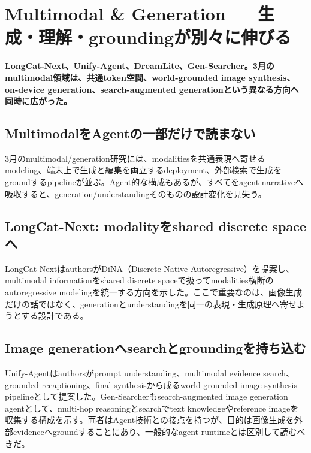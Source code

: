 \section{Multimodal \& Generation — 生成・理解・groundingが別々に伸びる}
\label{pkg:multimodal-generation-march}
\noindent\textbf{LongCat-Next、Unify-Agent、DreamLite、Gen-Searcher。3月のmultimodal領域は、共通token空間、world-grounded image synthesis、on-device generation、search-augmented generationという異なる方向へ同時に広がった。}\autocite{src-197775677c0d,src-abece2adf5a7,src-ac36472a8f09,src-b8369fd2c988}

\subsection{MultimodalをAgentの一部だけで読まない}

3月のmultimodal/generation研究には、modalitiesを共通表現へ寄せるmodeling、端末上で生成と編集を両立するdeployment、外部検索で生成をgroundするpipelineが並ぶ。Agent的な構成もあるが、すべてをagent narrativeへ吸収すると、generation/understandingそのものの設計変化を見失う。\autocite{src-197775677c0d,src-abece2adf5a7,src-ac36472a8f09,src-b8369fd2c988}


\subsection{LongCat-Next: modalityをshared discrete spaceへ}

LongCat-NextはauthorsがDiNA（Discrete Native Autoregressive）を提案し、multimodal informationをshared discrete spaceで扱ってmodalities横断のautoregressive modelingを統一する方向を示した。ここで重要なのは、画像生成だけの話ではなく、generationとunderstandingを同一の表現・生成原理へ寄せようとする設計である。\autocite{src-ac36472a8f09}


\subsection{Image generationへsearchとgroundingを持ち込む}

Unify-Agentはauthorsがprompt understanding、multimodal evidence search、grounded recaptioning、final synthesisから成るworld-grounded image synthesis pipelineとして提案した。Gen-Searcherもsearch-augmented image generation agentとして、multi-hop reasoningとsearchでtext knowledgeやreference imageを収集する構成を示す。両者はAgent技術との接点を持つが、目的は画像生成を外部evidenceへgroundすることにあり、一般的なagent runtimeとは区別して読むべきだ。\autocite{src-197775677c0d,src-abece2adf5a7}


